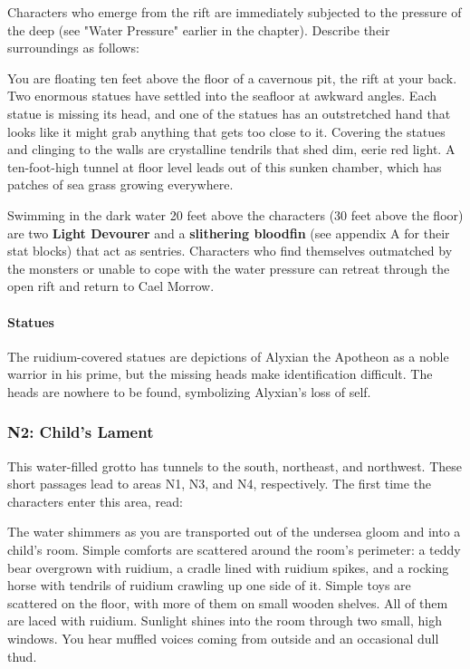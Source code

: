 \documentclass[10pt,a4,twoside,twocolumn,openany,nodeprecatedcode]{dndbook}
\begin{document}
Characters who emerge from the rift are immediately subjected to the pressure of the deep (see "Water Pressure" earlier in the chapter). Describe their surroundings as follows:
\begin{DndReadAloud}{}
You are floating ten feet above the floor of a cavernous pit, the rift at your back. Two enormous statues have settled into the seafloor at awkward angles. Each statue is missing its head, and one of the statues has an outstretched hand that looks like it might grab anything that gets too close to it. Covering the statues and clinging to the walls are crystalline tendrils that shed dim, eerie red light. A ten-foot-high tunnel at floor level leads out of this sunken chamber, which has patches of sea grass growing everywhere.
\end{DndReadAloud}

Swimming in the dark water 20 feet above the characters (30 feet above the floor) are two \textbf{Light Devourer} and a \textbf{slithering bloodfin} (see appendix A for their stat blocks) that act as sentries. Characters who find themselves outmatched by the monsters or unable to cope with the water pressure can retreat through the open rift and return to Cael Morrow.
\paragraph{Statues}
The ruidium-covered statues are depictions of Alyxian the Apotheon as a noble warrior in his prime, but the missing heads make identification difficult. The heads are nowhere to be found, symbolizing Alyxian's loss of self.
\subsubsection{N2: Child's Lament}
This water-filled grotto has tunnels to the south, northeast, and northwest. These short passages lead to areas N1, N3, and N4, respectively.
The first time the characters enter this area, read:
\begin{DndReadAloud}{}
The water shimmers as you are transported out of the undersea gloom and into a child's room. Simple comforts are scattered around the room's perimeter: a teddy bear overgrown with ruidium, a cradle lined with ruidium spikes, and a rocking horse with tendrils of ruidium crawling up one side of it. Simple toys are scattered on the floor, with more of them on small wooden shelves. All of them are laced with ruidium.
Sunlight shines into the room through two small, high windows. You hear muffled voices coming from outside and an occasional dull thud.
\end{DndReadAloud}
\end{document}

